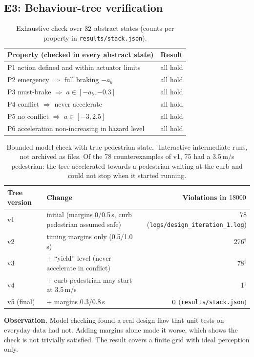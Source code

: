 \subsection{E3: Behaviour-tree verification}\label{sec:e3}
\begin{table}[H]\centering\small
\begin{tabular}{ll}\toprule
Property (checked in every abstract state) & Result\\\midrule
P1 action defined and within actuator limits & all hold\\
P2 emergency $\Rightarrow$ full braking $-a_b$ & all hold\\
P3 must-brake $\Rightarrow$ $a\in[-a_b,-0.3]$ & all hold\\
P4 conflict $\Rightarrow$ never accelerate & all hold\\
P5 no conflict $\Rightarrow$ $a\in[-3,2.5]$ & all hold\\
P6 acceleration non-increasing in hazard level & all hold\\\bottomrule
\end{tabular}
\caption{Exhaustive check over $32$ abstract states (counts per property in \texttt{results/stack.json}).}\label{tab:tree}
\end{table}
\begin{table}[H]\centering\small
\begin{tabular}{llr}\toprule
Tree version & Change & Violations in $18000$\\\midrule
v1 & initial (margins 0/0.5\,s, curb pedestrian assumed safe) & 78 (\texttt{logs/design\_iteration\_1.log})\\
v2 & timing margins only (0.5/1.0\,s) & 276$^\dagger$\\
v3 & + ``yield'' level (never accelerate in conflict) & 78$^\dagger$\\
v4 & + curb pedestrian may start at 3.5\,m/s & 1$^\dagger$\\
v5 (final) & + margins 0.3/0.8\,s & $0$ (\texttt{results/stack.json})\\\bottomrule
\end{tabular}
\caption{Bounded model check with true pedestrian state. $^\dagger$Interactive intermediate runs, not archived as files. Of the 78 counterexamples of v1, 75 had a 3.5\,m/s pedestrian: the tree accelerated towards a pedestrian waiting at the curb and could not stop when it started running.}
\end{table}
\textbf{Observation.} Model checking found a real design flaw that unit tests on everyday data had not. Adding margins alone made it worse, which shows the check is not trivially satisfied. The result covers a finite grid with ideal perception only.

